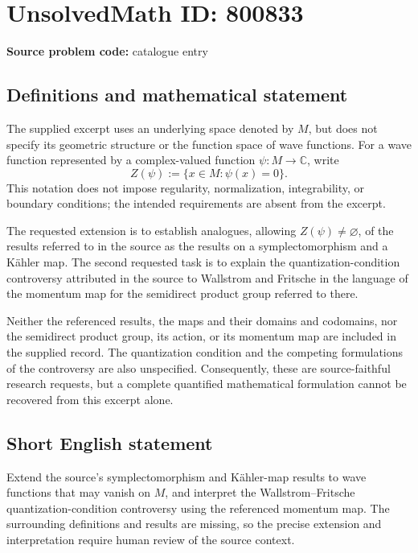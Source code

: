 \documentclass[11pt]{article}
\newcommand{\C}{\mathbb{C}}
\begin{document}
\section*{UnsolvedMath ID: 800833}
\textbf{Source problem code:} catalogue entry
\subsection{Definitions and mathematical statement}
The supplied excerpt uses an underlying space denoted by \(M\), but does not specify its geometric structure or the function space of wave functions. For a wave function represented by a complex-valued function \(\psi\colon M\to\C\), write
\[
Z(\psi):=\{x\in M:\psi(x)=0\}.
\]
This notation does not impose regularity, normalization, integrability, or boundary conditions; the intended requirements are absent from the excerpt.

The requested extension is to establish analogues, allowing \(Z(\psi)\ne\varnothing\), of the results referred to in the source as the results on a symplectomorphism and a K\"ahler map. The second requested task is to explain the quantization-condition controversy attributed in the source to Wallstrom and Fritsche in the language of the momentum map for the semidirect product group referred to there.

Neither the referenced results, the maps and their domains and codomains, nor the semidirect product group, its action, or its momentum map are included in the supplied record. The quantization condition and the competing formulations of the controversy are also unspecified. Consequently, these are source-faithful research requests, but a complete quantified mathematical formulation cannot be recovered from this excerpt alone.
\subsection{Short English statement}
Extend the source's symplectomorphism and K\"ahler-map results to wave functions that may vanish on \(M\), and interpret the Wallstrom--Fritsche quantization-condition controversy using the referenced momentum map. The surrounding definitions and results are missing, so the precise extension and interpretation require human review of the source context.
\end{document}
